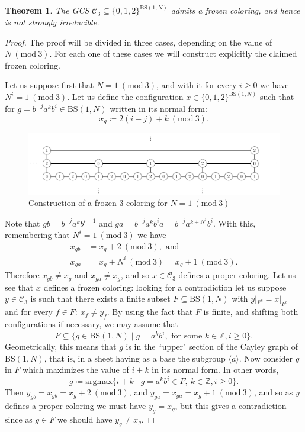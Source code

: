\documentclass[cupthm,crop,info]{CUP-JNL-ETS}%
\theoremstyle{cupplain}
\newtheorem{theorem}{Theorem}[section]
\theoremstyle{cupdefinition}
\theoremstyle{cupremark}
\theoremstyle{cupproof}
\newtheorem{proof}{Proof}
\numberwithin{equation}{section}
\newcommand{\BS}[1][N]{\mathrm{BS}(1,#1)}
\begin{document}
\begin{theorem}\label{thm:existence_frozen_3} The GCS $\mathcal{C}_3\subseteq \{0,1,2\}^{\BS}$ admits a frozen coloring, and hence is not strongly irreducible.
\end{theorem}
\begin{proof}The proof will be divided in three cases, depending on the value of $N \ (\mathrm{mod} \ 3)$. For each one of these cases we will construct explicitly the claimed frozen coloring.
	
	Let us suppose first that $N=1 \ (\mathrm{mod} \ 3)$, and with it for every $i\ge 0$ we have $N^i=1 \ (\mathrm{mod} \ 3)$.
	Let us define the configuration $x\in \{0,1,2\}^{\BS}$ such that for $g=b^{-j}a^k b^i\in \BS$ written in its normal form:
	$$
	x_g\coloneqq 2(i-j)+k \ (\mathrm{mod} \ 3).
	$$
	
	\begin{figure}
		\centering
\includegraphics[scale=0.6]{frozen3_n1mod3.pdf}
		\caption{Construction of a frozen $3$-coloring for $N=1\ (\mathrm{mod} \ 3)$}
		\label{fig:gcs_frozen_3_col_N_1}
	\end{figure}	
	
	Note that $gb=b^{-j}a^k b^{i+1}$ and $ga=b^{-j}a^k b^ia=b^{-j}a^{k+N^i}b^i$. With this, remembering that $N^i =1 \ (\mathrm{mod} \ 3)$ we have
	\begin{align*}
	x_{gb}&=x_g+2 \ (\mathrm{mod} \ 3), \text{ and} \\
	x_{ga}&=x_g+N^i \ (\mathrm{mod} \ 3) =x_g+1 \ (\mathrm{mod} \ 3).
	\end{align*}
	Therefore $x_{gb}\neq x_g$ and $x_{ga}\neq x_g$, and so $x\in \mathcal{C}_3$ defines a proper coloring. Let us see that $x$ defines a frozen coloring: looking for a contradiction let us suppose $y\in \mathcal{C}_3$ is such that there exists a finite subset $F\subseteq \BS$ with $y|_{F^ c}=x|_{F^c}$ and for every $f\in F: \ x_f\neq y_f$. By using the fact that $F$ is finite, and shifting both configurations if necessary, we may assume that $$F\subseteq \{g\in \BS\mid g=a^kb^i, \text{ for some }k\in \mathbb{Z}, i\ge 0\}.$$ 
	Geometrically, this means that $g$ is in the ``upper" section of the Cayley graph of $\BS$, that is, in a sheet having as a base the subgroup $\langle a\rangle$. Now consider $g$ in $F$ which maximizes the value of $i+k$ in its normal form. In other words,
	$$
	g\coloneqq \mathrm{argmax}\{i+k\mid g=a^kb^i\in F, \ k\in \mathbb{Z}, i\ge 0 \}.
	$$
	Then $y_{gb}=x_{gb}=x_g+2\ (\mathrm{mod} \ 3)$, and $y_{ga}=x_{ga}=x_g+1\ (\mathrm{mod} \ 3)$, and so as $y$ defines a proper coloring we must have $y_g=x_g$, but this gives a contradiction since as $g\in F$ we should have $y_g\neq x_g$.
	

\end{proof}
\end{document}
